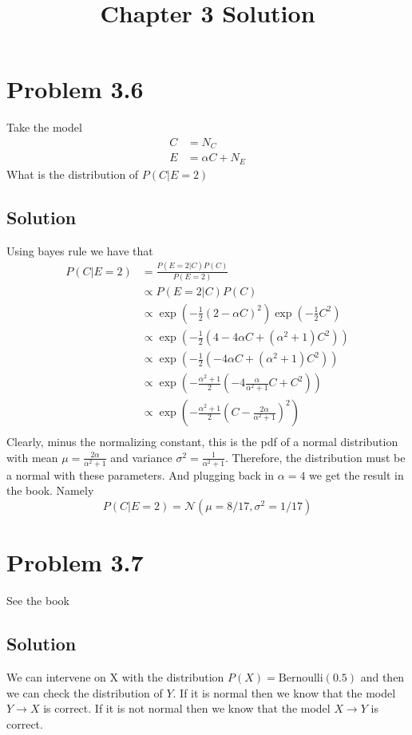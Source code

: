 \documentclass[11pt]{article}
\title{Chapter 3 Solution}
\begin{document}
\maketitle

\section*{Problem 3.6}
Take the model 
\begin{align*}
    C &= N_C \\
    E &= \alpha C + N_E
\end{align*}
What is the distribution of $P(C | E = 2)$
\subsection*{Solution}
Using bayes rule we have that 
\begin{align*}
P(C | E = 2) &= \frac{P(E = 2 | C) P(C)}{P(E = 2)} \\
&\propto P(E = 2 | C) P(C) \\
&\propto \exp\left( -\frac{1}{2} (2 - \alpha C)^2 \right) \exp\left(-\frac{1}{2} C^2\right) \\
&\propto \exp\left( -\frac{1}{2} (4 - 4 \alpha C +  (\alpha^2 + 1) C^2) \right) \\
&\propto \exp\left( -\frac{1}{2} (- 4 \alpha C +  (\alpha^2 + 1) C^2) \right) \\
&\propto \exp\left( -\frac{\alpha ^2 + 1}{2 } (- 4 \frac{\alpha}{\alpha^2 + 1} C +  C^2) \right) \\
&\propto \exp\left( -\frac{\alpha ^2 + 1}{2 } \left(C -  \frac{2\alpha }{\alpha^2 + 1}\right)^2\right) \\
\end{align*}
Clearly, minus the normalizing constant, this is the pdf of a normal distribution with
 mean $\mu = \frac{2\alpha }{\alpha^2 + 1}$ and variance $\sigma^2 = \frac{1}{\alpha^2 + 1}$.
 Therefore, the distribution must be a normal with these parameters.
 And plugging back in $\alpha = 4$ we get the result in the book. Namely 
\[P(C | E = 2) = \mathcal{N}(\mu = 8/17, \sigma^2 = 1/17)\]

\section*{Problem 3.7}
See the book
\subsection*{Solution}
We can intervene on X with the distribution $P(X) = \text{Bernoulli}(0.5)$ and then we can check the distribution of $Y$.
If it is normal then we know that the model $Y \rightarrow X$ is correct. 
If it is not normal then we know that the model $X \rightarrow Y$ is correct.


\end{document}
